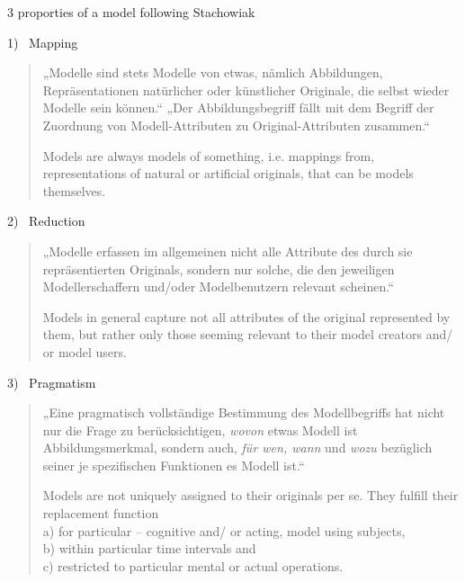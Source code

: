 \begin{frame}[allowframebreaks]{3 proporties of a model following Stachowiak}

\begin{alertblock}{1)~ Mapping }
\begin{quote} \scriptsize
    „Modelle sind stets Modelle von etwas, nämlich Abbildungen, Repräsentationen natürlicher oder künstlicher Originale, die selbst wieder Modelle sein können.“ 
    „Der Abbildungsbegriff fällt mit dem Begriff der Zuordnung von Modell-Attributen zu Original-Attributen zusammen.“ \parencite[131--132]{stachowiak} %
    
    \alert{Models are always models of something, i.e. mappings from, representations of natural or artificial originals, that can be models themselves.}
\end{quote}
\end{alertblock}
\begin{alertblock}{2)~ Reduction}
\begin{quote} \scriptsize
    „Modelle erfassen im allgemeinen nicht alle Attribute des durch sie repräsentierten Originals, sondern nur solche, die den jeweiligen Modellerschaffern und/oder Modelbenutzern relevant scheinen.“ \parencite[132]{stachowiak}
    
    \alert{Models in general capture not all attributes of the original represented by them, but rather only those seeming relevant to their model creators and/ or model users.}
\end{quote}
\end{alertblock}
\framebreak 

\begin{alertblock}{3)~ Pragmatism}
\begin{quote} \scriptsize
    „Eine pragmatisch vollständige Bestimmung des Modellbegriffs hat nicht nur die Frage zu berücksichtigen, \emph{wovon} etwas Modell ist \lbrack{}Abbildungsmerkmal\rbrack{}, sondern auch, \emph{für wen, wann} und \emph{wozu} bezüglich seiner je spezifischen Funktionen es Modell ist.“ \parencite[132]{stachowiak} %
    
    \alert{ Models are not uniquely assigned to their originals per se. They fulfill their replacement function \\
    a) for particular – cognitive and/ or acting, model using subjects, \\
    b) within particular time intervals and \\
    c) restricted to particular mental or actual operations.}
\end{quote}
\end{alertblock}

\end{frame}


